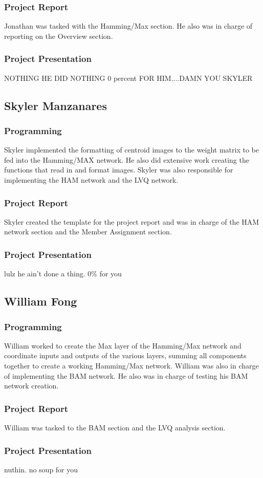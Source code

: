 \documentclass{article}
\begin{document}
\subsubsection{Project Report}
Jonathan was tasked with the Hamming/Max section. He also was in charge of reporting on the Overview section.

\subsubsection{Project Presentation}
NOTHING HE DID NOTHING 0 percent FOR HIM....DAMN YOU SKYLER

\subsection{Skyler Manzanares}

\subsubsection{Programming}
Skyler implemented the formatting of centroid images to the weight matrix to be fed into the Hamming/MAX network. He also did extensive work creating the functions that read in and format images. Skyler was also responsible for implementing
the HAM network and the LVQ network.

\subsubsection{Project Report}
Skyler created the template for the project report and was in charge of the HAM 
network section and the Member Assignment section.

\subsubsection{Project Presentation}
lulz he ain't done a thing.  0\% for you

\subsection{William Fong}
\subsubsection{Programming}
William worked to create the Max layer of the Hamming/Max network and coordinate 
inputs and outputs of the various layers, summing all components together to create a working Hamming/Max network. William was also in charge of implementing the BAM network. He also was in charge of testing his BAM network creation.
\subsubsection{Project Report}
William was tasked to the BAM section and the LVQ analysis section.

\subsubsection{Project Presentation}
nuthin. no soup for you 
\end{document}
